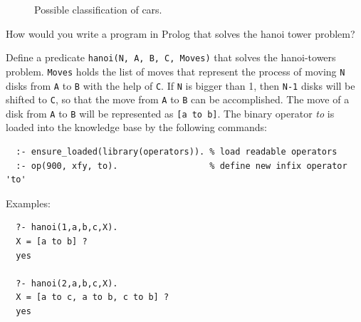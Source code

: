 \documentclass [11pt, a4wide, twoside]{article}
\begin{document}
\begin{figure}[h!]
  \caption{Possible classification of cars.}\label{cars}
\end{figure}

\solution{}

\newpage
{}
How would you write a program in Prolog that solves the hanoi tower problem?

\noindent Define a predicate \texttt{hanoi(N, A, B, C, Moves)} that solves the hanoi-towers problem. 
\texttt{Moves} holds the list of moves that represent the process of moving \texttt{N} disks from \texttt{A} to \texttt{B} with the help of \texttt{C}. 
If \texttt{N} is bigger than 1, then \texttt{N-1} disks will be shifted to \texttt{C}, so that the move from \texttt{A} to \texttt{B} can be accomplished. 
The move of a disk from \texttt{A} to \texttt{B} will be represented as \texttt{[a to b]}. 
The binary operator \emph{to} is loaded into the knowledge base by the following commands:
\begin{verbatim}
  :- ensure_loaded(library(operators)). % load readable operators
  :- op(900, xfy, to).                  % define new infix operator 'to'
\end{verbatim}
\noindent Examples:
\begin{verbatim}
  ?- hanoi(1,a,b,c,X).		
  X = [a to b] ?			
  yes					

  ?- hanoi(2,a,b,c,X).
  X = [a to c, a to b, c to b] ?
  yes
\end{verbatim}
\end{document}
